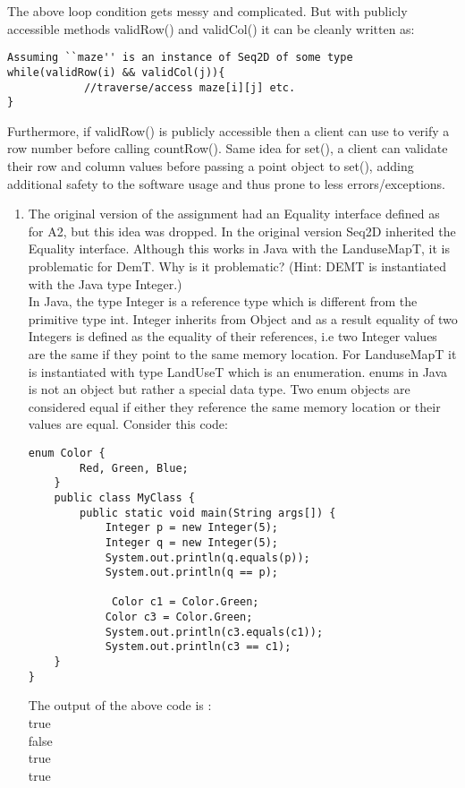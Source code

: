 \documentclass[12pt]{article}
\begin{document}
\begin{itemize}
\begin{itemize}
\begin{itemize}
The above loop condition gets messy and complicated. But with publicly accessible methods validRow() and validCol() it can be cleanly written as:\\
\begin{verbatim}
Assuming ``maze'' is an instance of Seq2D of some type
while(validRow(i) && validCol(j)){
			//traverse/access maze[i][j] etc.
}
\end{verbatim}

Furthermore, if validRow() is publicly accessible then a client can use to verify a row number before calling countRow(). Same idea for set(), a client can validate their row and column values before passing a point object to set(), adding additional safety to the software usage and thus prone to less errors/exceptions.


\begin{enumerate}
\item The original version of the assignment had an Equality interface defined
  as for A2, but this idea was dropped.  In the original version Seq2D inherited
  the Equality interface.  Although this works in Java with the LanduseMapT, it is
  problematic for DemT.  Why is it problematic?  (Hint: DEMT is instantiated
  with the Java type Integer.)\\
  
  In Java, the type Integer is a reference type which is different from the primitive type int. Integer inherits from Object and as a result equality of two Integers is defined as the equality of their references, i.e two Integer values are the same if they point to the same memory location. For LanduseMapT it is instantiated with type LandUseT which is an enumeration. enums in Java is not an object but rather a special data type. Two enum objects are considered equal if either they reference the same memory location or their values are equal. Consider this code:
  \begin{verbatim}
enum Color {
    	Red, Green, Blue;
	}
	public class MyClass {
    	public static void main(String args[]) {
      		Integer p = new Integer(5);
      		Integer q = new Integer(5);
      		System.out.println(q.equals(p));
      		System.out.println(q == p);
      
     		 Color c1 = Color.Green;
      		Color c3 = Color.Green;
      		System.out.println(c3.equals(c1));
      		System.out.println(c3 == c1);
    }
}
\end{verbatim}

The output of the above code is :\\
true\\
false\\
true\\
true\\


\end{enumerate}
\end{itemize}
\end{itemize}
\end{itemize}
\end{document}
